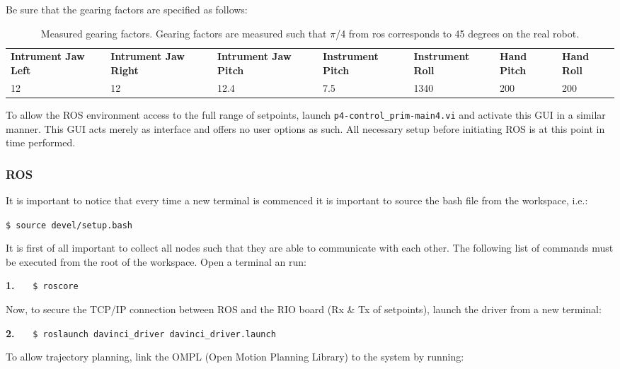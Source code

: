 Be sure that the gearing factors are specified as follows:
\begin{table}[H]
\begin{tabularx}{\textwidth}{X X X X X X X}
\rowcolor{HeaderBlue} 
\scriptsize \textbf{Intrument Jaw Left} &\scriptsize  \textbf{Intrument Jaw Right} &\scriptsize  \textbf{Intrument Jaw Pitch} &\scriptsize  \textbf{Instrument Pitch} &\scriptsize  \textbf{Instrument Roll} & \scriptsize   \textbf{Hand Pitch} &  \scriptsize\textbf{Hand Roll}\\
12 & 12 & 12.4 & 7.5 & 1340 & 200 & 200\\
\end{tabularx}
	\caption{Measured gearing factors. Gearing factors are measured such that $\pi$/4 from \gls{ros} corresponds to 45 degrees on the real robot.}
\label{tab:gearing}
\end{table}
To allow the ROS environment access to the full range of setpoints, launch \texttt{p4-control\_prim-main4.vi} and activate this GUI in a similar manner. This GUI acts merely as interface and offers no user options as such. All necessary setup before initiating ROS is at this point in time performed.
\subsubsection*{ROS}
It is important to notice that every time a new terminal is commenced it is important to source the bash file from the workspace, i.e.:

\hspace{1cm} \texttt{\$ source devel/setup.bash}

It is first of all important to collect all \gls{node}s such that they are able to communicate with each other. The following list of commands must be executed from the root of the workspace. Open a terminal an run:

\hspace{1cm} \textbf{1.} \ \ \ \texttt{\$ roscore} \ \ \ {}

Now, to secure the TCP/IP connection between ROS and the RIO board (Rx \& Tx of setpoints), launch the driver from a new terminal:

\hspace{1cm} \textbf{2.} \ \ \  \texttt{\$ roslaunch davinci\_driver davinci\_driver.launch} \ \ \ {} 

To allow trajectory planning, link the OMPL (Open Motion Planning Library) to the system by running: 

